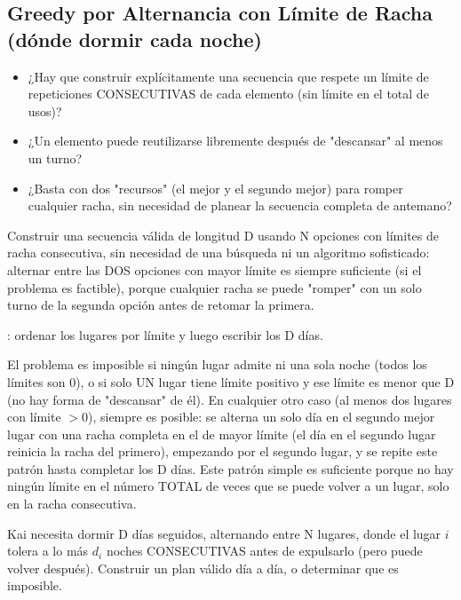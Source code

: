 \subsection{Greedy por Alternancia con Límite de Racha (dónde dormir cada noche)}
\label{alg:8-4}


\begin{itemize}
\item ¿Hay que construir explícitamente una secuencia que respete un límite de repeticiones CONSECUTIVAS de cada elemento (sin límite en el total de usos)?
\item ¿Un elemento puede reutilizarse libremente después de "descansar" al menos un turno?
\item ¿Basta con dos "recursos" (el mejor y el segundo mejor) para romper cualquier racha, sin necesidad de planear la secuencia completa de antemano?
\end{itemize}

 Construir una secuencia válida de longitud D usando N opciones con límites de racha consecutiva, sin necesidad de una búsqueda ni un algoritmo sofisticado: alternar entre las DOS opciones con mayor límite es siempre suficiente (si el problema es factible), porque cualquier racha se puede "romper" con un solo turno de la segunda opción antes de retomar la primera.

 : ordenar los lugares por límite y luego escribir los D días.

 El problema es imposible si ningún lugar admite ni una sola noche (todos los límites son 0), o si solo UN lugar tiene límite positivo y ese límite es menor que D (no hay forma de "descansar" de él). En cualquier otro caso (al menos dos lugares con límite $>0$), siempre es posible: se alterna un solo día en el segundo mejor lugar con una racha completa en el de mayor límite (el día en el segundo lugar reinicia la racha del primero), empezando por el segundo lugar, y se repite este patrón hasta completar los D días. Este patrón simple es suficiente porque no hay ningún límite en el número TOTAL de veces que se puede volver a un lugar, solo en la racha consecutiva.


Kai necesita dormir D días seguidos, alternando entre N lugares, donde el lugar $i$ tolera a lo más $d_i$ noches CONSECUTIVAS antes de expulsarlo (pero puede volver después). Construir un plan válido día a día, o determinar que es imposible.

